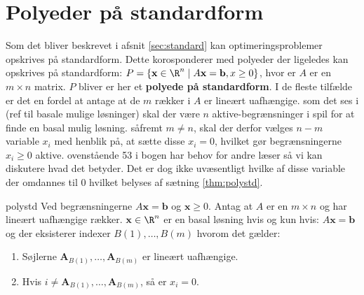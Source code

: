 \section{Polyeder på standardform}
\label{afsnit:fisk}
%
Som det bliver beskrevet i afsnit \ref{sec:standard} kan optimeringsproblemer opskrives på standardform.
Dette korosponderer med polyeder der ligeledes kan opskrives på standardform: 
$P=\{ \mathbf{x} \in \R^n \mid A\mathbf{x}=\mathbf{b},x \geq 0 \}$, hvor er $A$ er en $m \times n$ matrix.
$P$ bliver er her et \textbf{polyede på standardform}.
I de fleste tilfælde er det en fordel at antage at de $m$ rækker i $A$ er lineært uafhængige.
som det ses i (ref til basale mulige løsninger) skal der være $n$ aktive-begrænsninger i spil for at finde en basal mulig løsning.
såfremt $m \neq n$, skal der derfor vælges $n-m$ variable $x_i$ med henblik på, at sætte disse $x_i=0$, hvilket gør begrænsningerne $x_i \geq 0$ aktive.
ovenstående 53 i bogen har behov for andre læser så vi kan diskutere hvad det betyder.
Det er dog ikke uvæsentligt hvilke af disse variable der omdannes til $0$ hvilket belyses af sætning \ref{thm:polystd}.
\begin{thm}{}{polystd}
Ved begrænsningerne $A\mathbf{x}=\mathbf{b}$ og $\mathbf{x}\geq 0$.
Antag at $A$ er en $m \times n$ og har lineært uafhængige rækker.
$\mathbf{x} \in \R^n$ er en basal løsning hvis og kun hvis: $A\mathbf{x}=\mathbf{b}$ og der eksisterer indexer $B(1),\ldots,B(m)$ hvorom det gælder:
\begin{enumerate}[label=(\alph*)]
\item Søjlerne $\mathbf{A}_{B(1)},\ldots,\mathbf{A}_{B(m)}$ er lineært uafhængige.
\item Hvis $i \neq \mathbf{A}_{B(1)},\ldots,\mathbf{A}_{B(m)}$, så er $x_i=0$.
\end{enumerate}
\end{thm}
